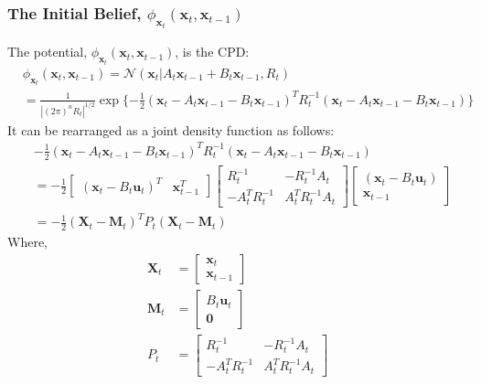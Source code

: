\subsubsection{The Initial Belief, $\phi_{\pmb{x}_t} (\pmb{x}_{t}, \pmb{x}_{t-1})$}
\label{subsubsection:initial_pot}

The potential, $\phi_{\pmb{x}_t} (\pmb{x}_{t}, \pmb{x}_{t-1})$, is the CPD:
\begin{align}
& \phi_{\pmb{x}_t} (\pmb{x}_{t}, \pmb{x}_{t-1}) = \mathcal{N}\left(\pmb{x}_{t} | A_{t} \pmb{x}_{t-1} + B_{t} \pmb{x}_{t-1}, R_{t} \right) \nonumber \\
 &= \frac{1}{ | (2 \pi)^{n} R_{t} |^{1/2} } \exp{ \{ -\frac{1}{2} \left( \pmb{x}_{t} - A_{t} \pmb{x}_{t-1} - B_{t} \pmb{x}_{t-1} \right)^{T} R_{t}^{-1} \left( \pmb{x}_{t} - A_{t} \pmb{x}_{t-1} - B_{t} \pmb{x}_{t-1} \right)\} }
\end{align}
It can be rearranged as a joint density function as follows:
\begin{align}
& -\frac{1}{2} \left( \pmb{x}_{t} - A_{t} \pmb{x}_{t-1} - B_{t} \pmb{x}_{t-1} \right)^{T} R_{t}^{-1} \left( \pmb{x}_{t} - A_{t} \pmb{x}_{t-1} - B_{t} \pmb{x}_{t-1} \right) \nonumber \\
&= -\frac{1}{2} \begin{bmatrix} \left( \pmb{x}_{t} - B_{t} \pmb{u}_{t} \right)^{T} & \pmb{x}_{t-1}^{T} \end{bmatrix} \begin{bmatrix} R_{t}^{-1} & -R_{t}^{-1} A_{t} \\ -A_{t}^{T} R_{t}^{-1} & A_{t}^{T} R_{t}^{-1} A_{t} \end{bmatrix} \begin{bmatrix} \left( \pmb{x}_{t} - B_{t} \pmb{u}_{t} \right) \\ \pmb{x}_{t-1} \end{bmatrix} \nonumber \\
&= -\frac{1}{2} \left( \pmb{X}_{t} - \pmb{M}_t \right)^{T} P_t \left( \pmb{X}_{t} - \pmb{M}_t \right) 
\end{align}
Where,
\begin{align}
\pmb{X}_{t} &= \begin{bmatrix} \pmb{x}_t \\ \pmb{x}_{t-1} \end{bmatrix} \\
\pmb{M}_t &= \begin{bmatrix} B_{t}\pmb{u}_t \\ \pmb{0} \end{bmatrix} \\
P_t &= \begin{bmatrix} R_{t}^{-1} & -R_{t}^{-1} A_{t} \\ -A_{t}^{T} R_{t}^{-1} & A_{t}^{T} R_{t}^{-1} A_{t} \end{bmatrix}
\end{align}
